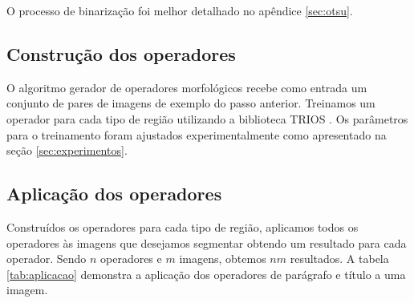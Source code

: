 \documentclass[a4paper,11pt]{article}
\begin{document}
      O processo de binarização foi melhor detalhado no apêndice \ref{sec:otsu}.

    \subsection{Construção dos operadores}

      O algoritmo gerador de operadores morfológicos recebe como entrada um conjunto de pares de imagens de exemplo do passo anterior. Treinamos um operador para cada tipo de região utilizando a biblioteca TRIOS \cite{dostrios}. Os parâmetros para o treinamento foram ajustados experimentalmente como apresentado na seção \ref{sec:experimentos}.

    \subsection{Aplicação dos operadores}

      Construídos os operadores para cada tipo de região, aplicamos todos os operadores às imagens que desejamos segmentar obtendo um resultado para cada operador. Sendo $n$ operadores e $m$ imagens, obtemos $nm$ resultados. A tabela \ref{tab:aplicacao} demonstra a aplicação dos operadores de parágrafo e título a uma imagem.
\end{document}
